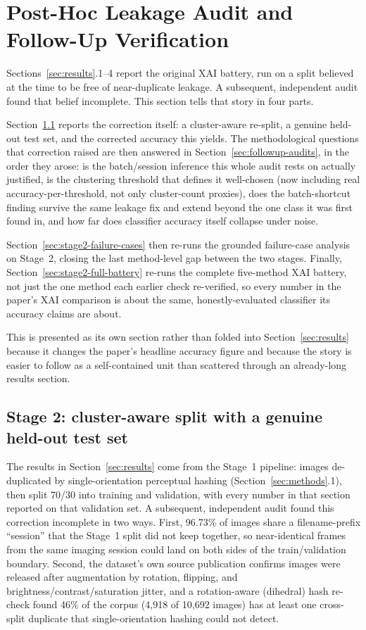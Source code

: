 \section{Post-Hoc Leakage Audit and Follow-Up Verification}
\label{sec:leakage-audit}

Sections~\ref{sec:results}.1--4 report the original XAI battery, run on a split believed at the time to be free of near-duplicate leakage. A subsequent, independent audit found that belief incomplete. This section tells that story in four parts.

Section~\ref{sec:stage2} reports the correction itself: a cluster-aware re-split, a genuine held-out test set, and the corrected accuracy this yields. The methodological questions that correction raised are then answered in Section~\ref{sec:followup-audits}, in the order they arose: is the batch/session inference this whole audit rests on actually justified, is the clustering threshold that defines it well-chosen (now including real accuracy-per-threshold, not only cluster-count proxies), does the batch-shortcut finding survive the same leakage fix and extend beyond the one class it was first found in, and how far does classifier accuracy itself collapse under noise.

Section~\ref{sec:stage2-failure-cases} then re-runs the grounded failure-case analysis on Stage~2, closing the last method-level gap between the two stages. Finally, Section~\ref{sec:stage2-full-battery} re-runs the complete five-method XAI battery, not just the one method each earlier check re-verified, so every number in the paper's XAI comparison is about the same, honestly-evaluated classifier its accuracy claims are about.

This is presented as its own section rather than folded into Section~\ref{sec:results} because it changes the paper's headline accuracy figure and because the story is easier to follow as a self-contained unit than scattered through an already-long results section.

\subsection{Stage 2: cluster-aware split with a genuine held-out test set}
\label{sec:stage2}

The results in Section~\ref{sec:results} come from the Stage~1 pipeline: images de-duplicated by single-orientation perceptual hashing (Section~\ref{sec:methods}.1), then split 70/30 into training and validation, with every number in that section reported on that validation set. A subsequent, independent audit found this correction incomplete in two ways. First, 96.73\% of images share a filename-prefix ``session'' that the Stage~1 split did not keep together, so near-identical frames from the same imaging session could land on both sides of the train/validation boundary. Second, the dataset's own source publication confirms images were released after augmentation by rotation, flipping, and brightness/contrast/saturation jitter, and a rotation-aware (dihedral) hash re-check found 46\% of the corpus (4,918 of 10,692 images) has at least one cross-split duplicate that single-orientation hashing could not detect.

